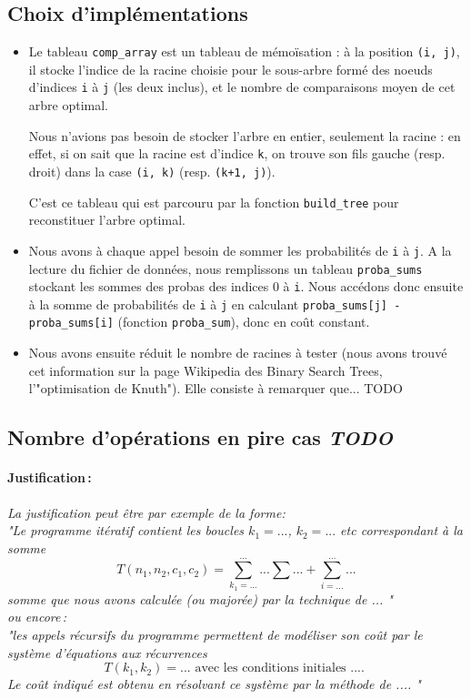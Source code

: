 \documentclass[a4paper, 10pt, french]{article}
\begin{document}
 \subsection{Choix d'implémentations}
 \begin{itemize}
	 \item Le tableau \verb?comp_array? est un tableau de mémoïsation : à la position \verb?(i, j)?, il stocke l'indice de la racine choisie pour le sous-arbre formé des noeuds d'indices \verb?i? à \verb?j? (les deux inclus), et le nombre de comparaisons moyen de cet arbre optimal.

		 Nous n'avions pas besoin de stocker l'arbre en entier, seulement la racine : en effet, si on sait que la racine est d'indice \verb?k?, on trouve son fils gauche (resp. droit) dans la case \verb?(i, k)? (resp. \verb?(k+1, j)?).

		 C'est ce tableau qui est parcouru par la fonction \verb?build_tree? pour reconstituer l'arbre optimal.

	 \item Nous avons à chaque appel besoin de sommer les probabilités de \verb?i? à \verb?j?. A la lecture du fichier de données, nous remplissons un tableau \verb?proba_sums? stockant les sommes des probas des indices 0 à \verb?i?.
		 Nous accédons donc ensuite à la somme de probabilités de \verb?i? à \verb?j? en calculant \verb?proba_sums[j] - proba_sums[i]? (fonction \verb?proba_sum?), donc en coût constant.

	 \item Nous avons ensuite réduit le nombre de racines à tester (nous avons trouvé cet information sur la page Wikipedia des Binary Search Trees, l'"optimisation de Knuth"). Elle consiste à remarquer que... TODO
 \end{itemize}

  \subsection{Nombre  d'opérations en pire cas \em TODO}
	\paragraph{Justification\,: }
	{\em La justification peut être par exemple de la forme: \\ 
	   "Le programme itératif contient les boucles $k_1=...$, $k_2= ...$ etc correspondant à la somme 
	  $$T(n_1, n_2, c_1, c_2) = \sum_{k_1=...}^{...} ... \sum ... + \sum_{i=...}^{...} ...$$ 
	  somme que nous avons calculée (ou majorée) par la technique de  ... " \\
	  ou  encore\,:  \\
	  "les appels récursifs du programme permettent de modéliser son coût par le système d'équations aux récurrences 
	  $$T(k_1, k_2) = ...  \mbox{~avec~les~conditions~initiales~....~} $$
	  Le coût indiqué est obtenu en résolvant ce système par la méthode de  .... "
	} 
\end{document}
